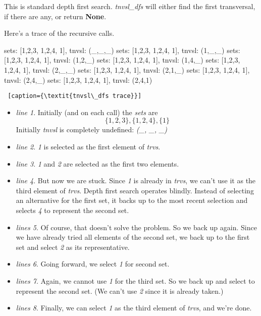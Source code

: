 This is standard depth first search. \textit{tnvsl\_dfs} will either find the first transversal, if there are any, or return \textbf{None}.

Here's a trace of the recursive calls.

\mediumv
\begin{minipage}[c]{0.45\textwidth}
\begin{python1}  
sets: [{1,2,3}, {1,2,4}, {1}], tnvsl: (_,_,_)
  sets: [{1,2,3}, {1,2,4}, {1}], tnvsl: (1,_,_)
    sets: [{1,2,3}, {1,2,4}, {1}], tnvsl: (1,2,_)
    sets: [{1,2,3}, {1,2,4}, {1}], tnvsl: (1,4,_)
  sets: [{1,2,3}, {1,2,4}, {1}], tnvsl: (2,_,_)
    sets: [{1,2,3}, {1,2,4}, {1}], tnvsl: (2,1,_)
    sets: [{1,2,3}, {1,2,4}, {1}], tnvsl: (2,4,_)
      sets: [{1,2,3}, {1,2,4}, {1}], tnvsl: (2,4,1)
\end{python1}\linv
\begin{lstlisting} [caption={\textit{tnvsl\_dfs trace}}]
\end{lstlisting}
\end{minipage}

\begin{itemize}
    \item \textit{line 1}. Initially (and on each call) the \textit{sets} are \[\{1, 2, 3\}, \{1, 2, 4\}, \{1\}\] Initially \textit{tnvsl} is completely undefined: \textit{(\_, \_, \_)}
    \item  \textit{line 2}. \textit{1} is selected as the first element of \textit{trvs}.
    \item  \textit{line 3}. \textit{1}  and \textit{2} are selected as the first two elements.
    \item \textit{line 4}. But now we are stuck. Since \textit{1} is already in \textit{trvs}, we can't use it as the third element of \textit{trvs}. Depth first search operates blindly. Instead of selecting an alternative for the first set, it backs up to the most recent selection and selects \textit{4} to represent the second set. 
    \item \textit{lines 5}. Of course, that doesn't solve the problem. So we back up again. Since we have already tried all elements of the second set, we back up to the first set and select \textit{2} as its representative. 
    \item \textit{lines 6}. Going forward, we select \textit{1} for second set.
    \item \textit{lines 7}. Again, we cannot use \textit{1} for the third set. So we back up and select  to represent the second set. (We can't use \textit{2} since it is already taken.)
    \item \textit{lines 8}. Finally, we can select \textit{1} as the third element of \textit{trvs}, and we're done.
\end{itemize}

